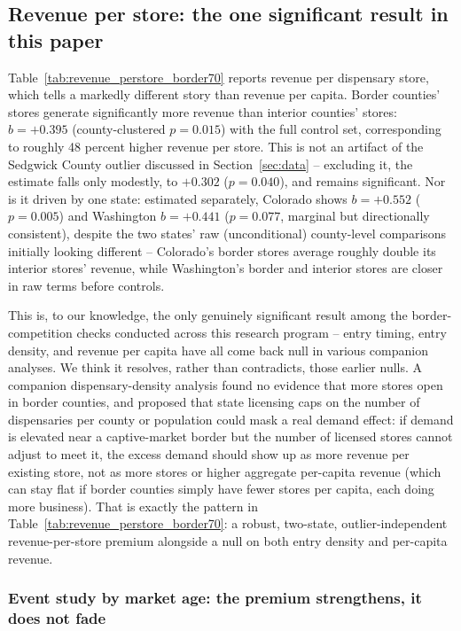 ﻿\documentclass{article}
\begin{document}
\subsection{Revenue per store: the one significant result in this paper}
\label{sec:revenue_perstore}

Table~\ref{tab:revenue_perstore_border70} reports revenue per dispensary store, which tells a markedly
different story than revenue per capita. Border counties' stores generate significantly more revenue than
interior counties' stores: $b=+0.395$ (county-clustered $p=0.015$) with the full control set, corresponding
to roughly 48 percent higher revenue per store. This is not an artifact of the Sedgwick County outlier
discussed in Section~\ref{sec:data} -- excluding it, the estimate falls only modestly, to $+0.302$
($p=0.040$), and remains significant. Nor is it driven by one state: estimated separately, Colorado shows
$b=+0.552$ ($p=0.005$) and Washington $b=+0.441$ ($p=0.077$, marginal but directionally consistent),
despite the two states' raw (unconditional) county-level comparisons initially looking different --
Colorado's border stores average roughly double its interior stores' revenue, while Washington's border
and interior stores are closer in raw terms before controls.

This is, to our knowledge, the only genuinely significant result among the border-competition checks
conducted across this research program -- entry timing, entry density, and revenue per capita have all
come back null in various companion analyses. We think it resolves, rather than contradicts, those
earlier nulls. A companion dispensary-density analysis found no evidence that more stores open in border
counties, and proposed that state licensing caps on the number of dispensaries per county or population
could mask a real demand effect: if demand is elevated near a captive-market border but the number of
licensed stores cannot adjust to meet it, the excess demand should show up as more revenue per existing
store, not as more stores or higher aggregate per-capita revenue (which can stay flat if border counties
simply have fewer stores per capita, each doing more business). That is exactly the pattern in
Table~\ref{tab:revenue_perstore_border70}: a robust, two-state, outlier-independent revenue-per-store
premium alongside a null on both entry density and per-capita revenue.



\subsubsection{Event study by market age: the premium strengthens, it does not fade}
\end{document}
